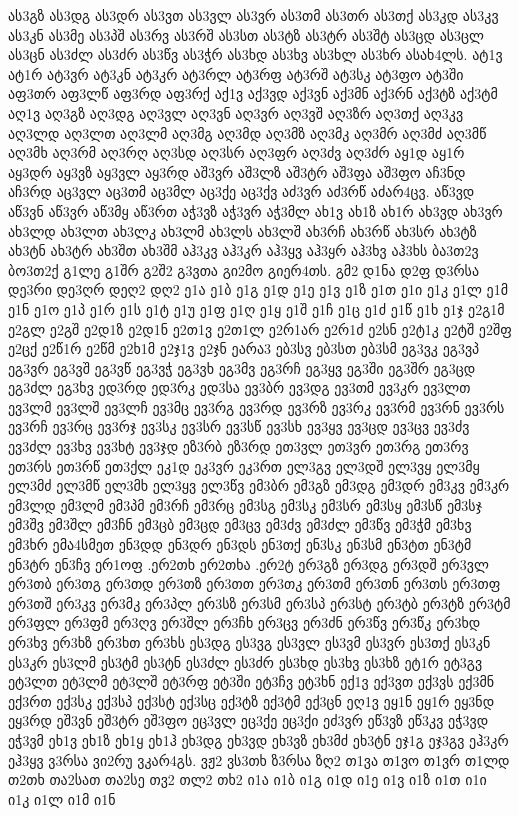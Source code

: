 {{ას3გზ
ას3დგ
ას3დრ
ას3ვთ
ას3ვლ
ას3ვრ
ას3თმ
ას3თრ
ას3თქ
ას3კდ
ას3კვ
ას3კნ
ას3მე
ას3პშ
ას3რვ
ას3რშ
ას3სთ
ას3ტზ
ას3ტრ
ას3შტ
ას3ცდ
ას3ცლ
ას3ცნ
ას3ძლ
ას3ძრ
ას3წვ
ას3ჭრ
ას3ხდ
ას3ხვ
ას3ხლ
ას3ხრ
ასახ4ლს.
ატ1ვ
ატ1რ
ატ3ვრ
ატ3კნ
ატ3კრ
ატ3რლ
ატ3რფ
ატ3რშ
ატ3სკ
ატ3ფო
ატ3ში
აფ3თრ
აფ3ლწ
აფ3რდ
აფ3რქ
აქ1ვ
აქ3ვდ
აქ3ვნ
აქ3მნ
აქ3რნ
აქ3ტზ
აქ3ტმ
აღ1ვ
აღ3გზ
აღ3დგ
აღ3ვლ
აღ3ვნ
აღ3ვრ
აღ3ვშ
აღ3ზრ
აღ3თქ
აღ3კვ
აღ3ლდ
აღ3ლთ
აღ3ლმ
აღ3მგ
აღ3მდ
აღ3მზ
აღ3მკ
აღ3მრ
აღ3მძ
აღ3მწ
აღ3მხ
აღ3რმ
აღ3რღ
აღ3სდ
აღ3სრ
აღ3ფრ
აღ3ძვ
აღ3ძრ
აყ1დ
აყ1რ
აყ3დრ
აყ3ვზ
აყ3ვლ
აყ3რდ
აშ3ვრ
აშ3ლზ
აშ3ტრ
აშ3ფა
აშ3ფო
აჩ3ნდ
აჩ3რდ
აც3ვლ
აც3თმ
აც3მლ
აც3ქე
აც3ქვ
აძ3ვრ
აძ3რწ
აძარ4ცვ.
აწ3ვდ
აწ3ვნ
აწ3ვრ
აწ3მყ
აწ3რთ
აჭ3ვზ
აჭ3ვრ
აჭ3მლ
ახ1ვ
ახ1ზ
ახ1რ
ახ3ვდ
ახ3ვრ
ახ3ლდ
ახ3ლთ
ახ3ლკ
ახ3ლმ
ახ3ლს
ახ3ლშ
ახ3რჩ
ახ3რწ
ახ3სრ
ახ3ტზ
ახ3ტნ
ახ3ტრ
ახ3შთ
ახ3შმ
აჰ3კვ
აჰ3კრ
აჰ3ყვ
აჰ3ყრ
აჰ3ხვ
აჰ3ხს
ბა3თ2ვ
ბო3თ2ქ
გ1ლე
გ1შრ
გ2შ2
გ3ვთა
გი2მო
გიერ4თს.
გმ2
დ1ნა
დ2ფ
დ3რსა
დე3რი
დე3ღრ
დეღ2
დღ2
ე1ა
ე1ბ
ე1გ
ე1დ
ე1ე
ე1ვ
ე1ზ
ე1თ
ე1ი
ე1კ
ე1ლ
ე1მ
ე1ნ
ე1ო
ე1პ
ე1რ
ე1ს
ე1ტ
ე1უ
ე1ფ
ე1ღ
ე1ყ
ე1შ
ე1ჩ
ე1ც
ე1ძ
ე1წ
ე1ხ
ე1ჯ
ე2გ1მ
ე2გლ
ე2გშ
ე2დ1ზ
ე2დ1ნ
ე2თ1ვ
ე2თ1ლ
ე2რ1არ
ე2რ1ძ
ე2სნ
ე2ტ1კ
ე2ტშ
ე2შფ
ე2ცქ
ე2წ1რ
ე2წმ
ე2ხ1მ
ე2ჯ1ვ
ე2ჯნ
ეარა3
ებ3სვ
ებ3სთ
ებ3სმ
ეგ3ვკ
ეგ3ვპ
ეგ3ვრ
ეგ3ვშ
ეგ3ვწ
ეგ3ვჭ
ეგ3ვხ
ეგ3მვ
ეგ3რჩ
ეგ3ყვ
ეგ3ში
ეგ3შრ
ეგ3ცდ
ეგ3ძლ
ეგ3ხვ
ედ3რდ
ედ3რკ
ედ3სა
ევ3ბრ
ევ3დგ
ევ3თმ
ევ3კრ
ევ3ლთ
ევ3ლმ
ევ3ლშ
ევ3ლჩ
ევ3მც
ევ3რგ
ევ3რდ
ევ3რზ
ევ3რკ
ევ3რმ
ევ3რნ
ევ3რს
ევ3რჩ
ევ3რც
ევ3რჯ
ევ3სკ
ევ3სრ
ევ3სწ
ევ3სხ
ევ3ყვ
ევ3ცდ
ევ3ცვ
ევ3ძვ
ევ3ძლ
ევ3ხვ
ევ3ხტ
ევ3ჯდ
ეზ3რბ
ეზ3რდ
ეთ3ვლ
ეთ3ვრ
ეთ3რგ
ეთ3რვ
ეთ3რს
ეთ3რწ
ეთ3ქლ
ეკ1დ
ეკ3ვრ
ეკ3რთ
ელ3გვ
ელ3დშ
ელ3ვყ
ელ3მყ
ელ3მძ
ელ3მწ
ელ3მხ
ელ3ყვ
ელ3წვ
ემ3ბრ
ემ3გზ
ემ3დგ
ემ3დრ
ემ3კვ
ემ3კრ
ემ3ლდ
ემ3ლმ
ემ3პმ
ემ3რჩ
ემ3რც
ემ3სგ
ემ3სკ
ემ3სრ
ემ3სყ
ემ3სწ
ემ3სჯ
ემ3შვ
ემ3შლ
ემ3ჩნ
ემ3ცბ
ემ3ცდ
ემ3ცვ
ემ3ძვ
ემ3ძლ
ემ3წვ
ემ3ჭმ
ემ3ხვ
ემ3ხრ
ემა4სმეთ
ენ3დდ
ენ3დრ
ენ3დს
ენ3თქ
ენ3სკ
ენ3სმ
ენ3ტთ
ენ3ტმ
ენ3ტრ
ენ3ჩვ
ერ1ოფ
.ერ2თხ
ერ2თხა
.ერ2ტ
ერ3გზ
ერ3დგ
ერ3დშ
ერ3ვლ
ერ3თბ
ერ3თგ
ერ3თდ
ერ3თზ
ერ3თთ
ერ3თკ
ერ3თმ
ერ3თნ
ერ3თს
ერ3თფ
ერ3თშ
ერ3კვ
ერ3მკ
ერ3პლ
ერ3სზ
ერ3სმ
ერ3სპ
ერ3სტ
ერ3ტბ
ერ3ტზ
ერ3ტმ
ერ3ფლ
ერ3ფმ
ერ3ღვ
ერ3შლ
ერ3ჩხ
ერ3ცვ
ერ3ძნ
ერ3წვ
ერ3წკ
ერ3ხდ
ერ3ხვ
ერ3ხზ
ერ3ხთ
ერ3ხს
ეს3დგ
ეს3ვგ
ეს3ვლ
ეს3ვმ
ეს3ვრ
ეს3თქ
ეს3კნ
ეს3კრ
ეს3ლმ
ეს3ტმ
ეს3ტნ
ეს3ძლ
ეს3ძრ
ეს3ხდ
ეს3ხვ
ეს3ხზ
ეტ1რ
ეტ3გვ
ეტ3ლთ
ეტ3ლმ
ეტ3ლშ
ეტ3რფ
ეტ3ში
ეტ3ჩვ
ეტ3ხნ
ექ1ვ
ექ3ვთ
ექ3ვს
ექ3მნ
ექ3რთ
ექ3სკ
ექ3სპ
ექ3სტ
ექ3სც
ექ3ტზ
ექ3ტმ
ექ3ცნ
ეღ1ვ
ეყ1ნ
ეყ1რ
ეყ3ნდ
ეყ3რდ
ეშ3ვნ
ეშ3ტრ
ეშ3ფო
ეც3ვლ
ეც3ქე
ეც3ქი
ეძ3ვრ
ეწ3ვზ
ეწ3კვ
ეჭ3ვდ
ეჭ3ვმ
ეხ1ვ
ეხ1ზ
ეხ1ყ
ეხ1ჰ
ეხ3დგ
ეხ3ვდ
ეხ3ვზ
ეხ3მძ
ეხ3ტნ
ეჯ1გ
ეჯ3გვ
ეჰ3კრ
ეჰ3ყვ
ვ3რსა
ვი2რუ
ვკარ4გს.
ვჟ2
ვს3თხ
ზ3რსა
ზღ2
თ1ვა
თ1ვო
თ1ვრ
თ1ლდ
თ2თხ
თა2სათ
თა2სე
თვ2
თლ2
თხ2
ი1ა
ი1ბ
ი1გ
ი1დ
ი1ე
ი1ვ
ი1ზ
ი1თ
ი1ი
ი1კ
ი1ლ
ი1მ
ი1ნ
}}
